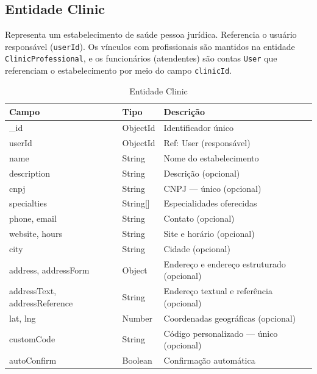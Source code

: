 \subsection{Entidade Clinic}
\label{subsec:entity-clinic}

Representa um estabelecimento de saúde pessoa jurídica.
Referencia o usuário responsável (\texttt{userId}).
Os vínculos com profissionais são mantidos na entidade
\texttt{ClinicProfessional}, e os funcionários
(atendentes) são contas \texttt{User} que referenciam
o estabelecimento por meio do campo \texttt{clinicId}.

\begin{table}[H]
  \centering
  \caption{Entidade Clinic}
  \label{tab:entity-clinic}
  \begin{tabular}{p{3.8cm}p{2.5cm}p{5.2cm}}
    \toprule
    \textbf{Campo} &
    \textbf{Tipo} &
    \textbf{Descrição} \\
    \midrule
    \_id                      & ObjectId & Identificador único \\
    userId                    & ObjectId & Ref: User (responsável) \\
    name                      & String   & Nome do estabelecimento \\
    description               & String   & Descrição (opcional) \\
    cnpj                      & String   & CNPJ --- único (opcional) \\
    specialties               & String[] & Especialidades oferecidas \\
    phone, email              & String   & Contato (opcional) \\
    website, hours            & String   & Site e horário (opcional) \\
    city                      & String   & Cidade (opcional) \\
    address, addressForm      & Object   & Endereço e endereço
                                           estruturado (opcional) \\
    addressText,
    addressReference          & String   & Endereço textual e
                                           referência (opcional) \\
    lat, lng                  & Number   & Coordenadas geográficas (opcional) \\
    customCode                & String   & Código personalizado ---
                                           único (opcional) \\
    autoConfirm               & Boolean  & Confirmação automática \\

\end{tabular}
\end{table}
